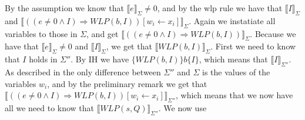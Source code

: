 By the assumption we know that $\llbracket e \rrbracket_{\Sigma} \neq 0$, and by the wlp rule we have that $\llbracket I \rrbracket_{\Sigma}$ and $\llbracket ((e \neq 0 \land I) \Rightarrow WLP(b, I)) [ w_{i} \leftarrow x_{i}] \rrbracket_{\Sigma}$.
Again we instatiate all variables to those in $\Sigma$, and get $\llbracket ((e \neq 0 \land I) \Rightarrow WLP(b, I)) \rrbracket_{\Sigma}$.
Because we have that $\llbracket e \rrbracket_{\Sigma} \neq 0$ and $\llbracket I \rrbracket_{\Sigma}$, we get that $\llbracket WLP(b, I) \rrbracket_{\Sigma}$.
First we need to know that $I$ holds in $\Sigma''$. By IH we have $\{WLP(b, I)\}b\{I\}$, which means that $\llbracket I \rrbracket_{\Sigma''}$.
As described in \cite{wlp} the only difference between $\Sigma''$ and $\Sigma$ is the values of the variables $w_{i}$, and by the preliminary remark we get that $\llbracket ((e \neq 0 \land I) \Rightarrow WLP(b, I)) [ w_{i} \leftarrow x_{i}] \rrbracket_{\Sigma''}$, which means that we now have all we need to know that $\llbracket WLP(s, Q) \rrbracket_{\Sigma''}$.
We now use
